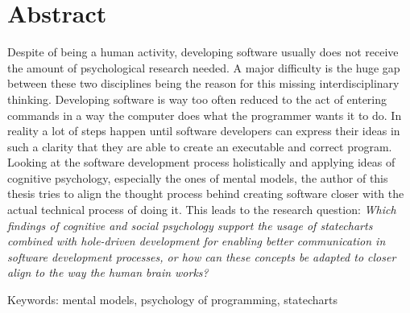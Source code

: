 \chapter{Abstract}
Despite of being a human activity, developing software usually does not receive the amount of psychological research needed.
A major difficulty is the huge gap between these two disciplines being the reason for this missing interdisciplinary thinking.
Developing software is way too often reduced to the act of entering commands in a way the computer does what the programmer wants it to do.
In reality a lot of steps happen until software developers can express their ideas in such a clarity that they are able to create an executable and correct program.
Looking at the software development process holistically and applying ideas of cognitive psychology, especially the ones of mental models, the author of this thesis tries to align the thought process behind creating software closer with the actual technical process of doing it.
This leads to the research question: \emph{Which findings of cognitive and social psychology support the usage of statecharts combined with hole-driven development for enabling better communication in software development processes, or how can these concepts be adapted to closer align to the way the human brain works?}

\vspace{2cm}
\noindent
Keywords: mental models, psychology of programming, statecharts